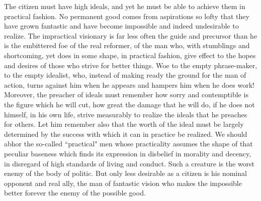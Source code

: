 \documentclass{scrbook}
\begin{document}
The citizen must have high ideals, and yet he must be able to achieve them in practical
fashion. No permanent good comes from aspirations so lofty that they have grown fantastic
and have become impossible and indeed undesirable to realize. The impractical visionary is
far less often the guide and precursor than he is the embittered foe of the real reformer, of the
man who, with stumblings and shortcoming, yet does in some shape, in practical fashion,
give effect to the hopes and desires of those who strive for better things. Woe to the empty
phrase-maker, to the empty idealist, who, instead of making ready the ground for the man of
action, turns against him when he appears and hampers him when he does work! Moreover,
the preacher of ideals must remember how sorry and contemptible is the figure which he
will cut, how great the damage that he will do, if he does not himself, in his own life, strive
measurably to realize the ideals that he preaches for others. Let him remember also that the
worth of the ideal must be largely determined by the success with which it can in practice
be realized. We should abhor the so-called ``practical" men whose practicality assumes
the shape of that peculiar baseness which finds its expression in disbelief in morality and
decency, in disregard of high standards of living and conduct. Such a creature is the worst
enemy of the body of politic. But only less desirable as a citizen is his nominal opponent
and real ally, the man of fantastic vision who makes the impossible better forever the enemy
of the possible good.
\end{document}
